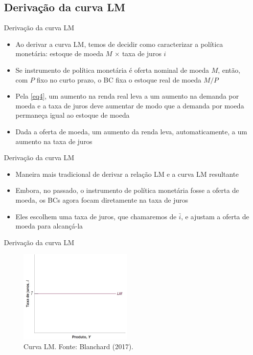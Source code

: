 \documentclass[10pt]{beamer}
\begin{document}
\subsection{Derivação da curva LM}
\begin{frame}{Derivação da curva LM}
    \begin{itemize}
        \item Ao derivar a curva LM, temos de decidir como caracterizar a política monetária: estoque de moeda $M$ $\times$ taxa de juros $i$
        \bigskip
        \item Se instrumento de política monetária é oferta nominal de moeda $M$, então, com $P$ fixo no curto prazo, o BC fixa o estoque real de moeda $M/P$
        \bigskip
        \item Pela \ref{eq4}, um aumento na renda real leva a um aumento na demanda por moeda e a taxa de juros deve aumentar de modo que a demanda por moeda permaneça igual ao estoque de moeda
        \bigskip
        \item Dada a oferta de moeda, um aumento da renda leva, automaticamente, a um aumento na taxa de juros
    \end{itemize}
\end{frame}

\begin{frame}{Derivação da curva LM}
    \begin{itemize}
        \item Maneira mais tradicional de derivar a relação LM e a curva LM resultante
        \bigskip
        \item Embora, no passado, o instrumento de política monetária fosse a oferta de moeda, os BCs agora focam diretamente na taxa de juros
        \bigskip
        \item Eles escolhem uma taxa de juros, que chamaremos de $\bar{i}$, e ajustam a oferta de moeda para alcançá-la
    \end{itemize}
\end{frame}

\begin{frame}{Derivação da curva LM}
    \begin{figure}
        \centering
        \includegraphics[width=0.5\textwidth]{./figures/aula082_fig3.JPG}
        \caption{Curva LM. Fonte: Blanchard (2017).}
        \label{fig:lm}
    \end{figure}
\end{frame}
\end{document}
